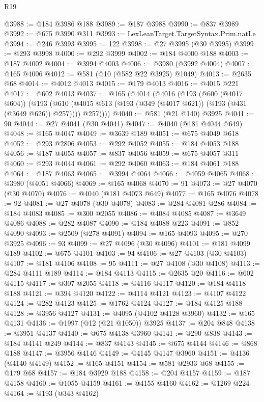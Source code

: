 \begin{lexlean}{R19}
\begin{coremodule}
@3988 := @184 @3986 @188
@3989 := @187 @3988
@3990 := @837 @3989
@3992 := @675 @3990 @311
@3993 := LexLeanTarget.TargetSyntax.Prim.natLe
@3994 := @246 @3993
@3995 := 122
@3998 := @27 @3995 (@30 @3995)
@3999 := @293 @3998
@4000 := @292 @3999
@4002 := @184 @4000 @188
@4003 := @187 @4002
@4004 := @3994 @4003
@4006 := @3980 (@3992 @4004)
@4007 := @165 @4006
@4012 := @581 (@10 (@582 @22 @3925) @1049)
@4013 := @2635 @68
@4014 := @4012 @4013
@4015 := @179 @4013
@4016 := @4015 @221
@4017 := @602 @4013
@4037 := @165
    (@4014
      (@4016
        (@193
          (@600 (@4017 @604))
          (@193
            (@610 (@4015 @613 (@193 (@349 (@4017 @621)) (@193 (@431 (@3649 @626)) @257))))
            @257))))
@4040 := @581 (@21 @140) @3925
@4041 := 90
@4044 := @27 @4041 (@30 @4041)
@4047 := @4040 (@181 @4044 @649)
@4048 := @165 @4047
@4049 := @3639 @189
@4051 := @675 @4049 @618
@4052 := @293 @2806
@4053 := @292 @4052
@4055 := @184 @4053 @188
@4056 := @187 @4055
@4057 := @837 @4056
@4059 := @675 @4057 @311
@4060 := @293 @4044
@4061 := @292 @4060
@4063 := @184 @4061 @188
@4064 := @187 @4063
@4065 := @3994 @4064
@4066 := @4059 @4065
@4068 := @3980 (@4051 @4066)
@4069 := @165 @4068
@4070 := 91
@4073 := @27 @4070 (@30 @4070)
@4076 := @4040 (@181 @4073 @649)
@4077 := @165 @4076
@4078 := 92
@4081 := @27 @4078 (@30 @4078)
@4083 := @284 @4081 @286
@4084 := @184 @4083
@4085 := @300 @2055
@4086 := @4084 @4085
@4087 := @3649 @4086
@4088 := @282 @4087
@4090 := @184 @4088 @223
@4091 := @852 @4090
@4093 := @2509 (@278 @4091)
@4094 := @165 @4093
@4095 := @270 @3925
@4096 := 93
@4099 := @27 @4096 (@30 @4096)
@4101 := @181 @4099 @189
@4102 := @675 @4101
@4103 := 94
@4106 := @27 @4103 (@30 @4103)
@4107 := @181 @4106
@4108 := 95
@4111 := @27 @4108 (@30 @4108)
@4113 := @284 @4111 @189
@4114 := @184 @4113
@4115 := @2635 @20
@4116 := @602 @4115
@4117 := @307 @2055
@4118 := @4116 @4117
@4120 := @184 @4118 @188
@4121 := @394 @4120
@4122 := @4114 @4121
@4123 := @4107 @4122
@4124 := @282 @4123
@4125 := @1762 @4124
@4127 := @184 @4125 @188
@4128 := @3956 @4127
@4131 := @4095 (@4102 @4128 @3960)
@4132 := @165 @4131
@4136 := @1997 (@12 (@21 @1050)) @3925
@4137 := @204 @848
@4138 := @3951 @4137
@4140 := @675 @4138 @3960
@4141 := @290 @838
@4143 := @184 @4141 @249
@4144 := @837 @4143
@4145 := @675 @4144
@4146 := @868 @188
@4147 := @3956 @4146
@4149 := @4145 @4147 @3960
@4151 := @4136 (@4140 @4149)
@4152 := @165 @4151
@4154 := @581 @2933 @68
@4155 := @179 @68
@4157 := @184 @3929 @188
@4158 := @204 @4157
@4159 := @187 @4158
@4160 := @1055 @4159
@4161 := @4155 @4160
@4162 := @1269 @224
@4164 := @193 (@343 @4162)

\end{coremodule}
\end{lexlean}
